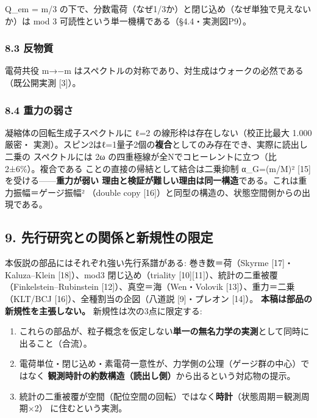 \documentclass[
]{ltjsarticle}
\providecommand{\tightlist}{%
  \setlength{\itemsep}{0pt}\setlength{\parskip}{0pt}}
\begin{document}
Q\_em = m/3
の下で、分数電荷（なぜ1/3か）と閉じ込め（なぜ単独で見えないか）は mod 3
可読性という単一機構である（§4.4・実測図P9）。

\subsubsection{8.3 反物質}\label{ux53cdux7269ux8cea}

電荷共役 m→−m はスペクトルの対称であり、対生成はウォークの必然である
（既公開実測 {[}3{]}）。

\subsubsection{8.4 重力の弱さ}\label{ux91cdux529bux306eux5f31ux3055}

凝縮体の回転生成子スペクトルに ℓ=2 の線形枠は存在しない（校正比最大
1.000 厳密・
実測）。スピン2はℓ=1量子2個の\textbf{複合}としてのみ存在でき、実際に読出し二乗の
スペクトルには 2ω の四重極線が全Nでコヒーレントに立つ（比
2±6\%）。複合である ことの直接の帰結として結合は二乗抑制 α\_G=(m/M)²
{[}15{]} を受ける------\textbf{重力が弱い
理由と検証が難しい理由は同一構造}である。これは重力振幅＝ゲージ振幅²
（double copy {[}16{]}）と同型の構造の、状態空間側からの出現である。

\subsection{9.
先行研究との関係と新規性の限定}\label{ux5148ux884cux7814ux7a76ux3068ux306eux95a2ux4fc2ux3068ux65b0ux898fux6027ux306eux9650ux5b9a}

本仮説の部品にはそれぞれ強い先行系譜がある: 巻き数＝荷（Skyrme
{[}17{]}・ Kaluza--Klein {[}18{]}）、mod3 閉じ込め（triality
{[}10{]}{[}11{]}）、統計の二重被覆 （Finkelstein--Rubinstein
{[}12{]}）、真空＝海（Wen・Volovik {[}13{]}）、重力＝二乗 （KLT/BCJ
{[}16{]}）、全種割当の企図（八道説 {[}9{]}・プレオン {[}14{]}）。
\textbf{本稿は部品の新規性を主張しない。} 新規性は次の3点に限定する:

\begin{enumerate}
\def\labelenumi{\arabic{enumi}.}
\tightlist
\item
  これらの部品が、粒子概念を仮定しない\textbf{単一の無名力学の実測}として同時に
  出ること（合流）。
\item
  電荷単位・閉じ込め・素電荷一意性が、力学側の公理（ゲージ群の中心）ではなく
  \textbf{観測時計の約数構造（読出し側）}から出るという対応物の提示。
\item
  統計の二重被覆が空間（配位空間の回転）ではなく\textbf{時計}（状態周期＝観測周期×2）
  に住むという実測。
\end{enumerate}
\end{document}
